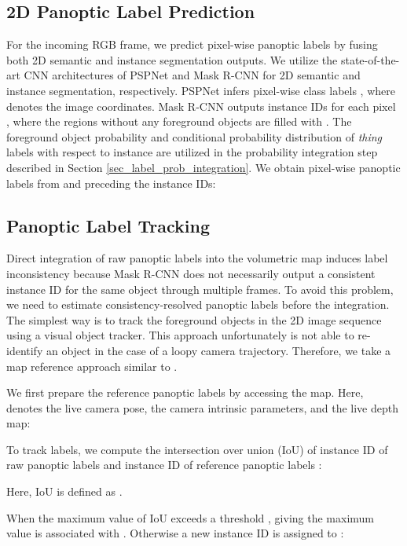 \documentclass[letterpaper, 10pt, conference]{latex_template/ieeeconf}
\begin{document}
\subsection{2D Panoptic Label Prediction\label{sec_pano_seg}}
For the incoming RGB frame, we predict pixel-wise panoptic labels by fusing both 2D semantic and instance segmentation outputs.
We utilize the state-of-the-art CNN architectures of PSPNet \cite{zhao2017pyramid} and Mask R-CNN \cite{he2017mask} for 2D semantic and instance segmentation, respectively.
PSPNet infers pixel-wise class labels , where  denotes the image coordinates.
Mask R-CNN outputs instance IDs for each pixel , where the regions without any foreground objects are filled with .
The foreground object probability  and conditional probability distribution of {\it thing} labels  with respect to instance  are utilized in the probability integration step described in Section \ref{sec_label_prob_integration}.
We obtain pixel-wise panoptic labels  from  and  preceding the instance IDs:



\subsection{Panoptic Label Tracking\label{sec_label_tracking}}
Direct integration of raw panoptic labels  into the volumetric map induces label inconsistency because Mask R-CNN does not necessarily output a consistent instance ID for the same object through multiple frames.
To avoid this problem, we need to estimate consistency-resolved panoptic labels  before the integration.
The simplest way is to track the foreground objects in the 2D image sequence using a visual object tracker.
This approach unfortunately is not able to re-identify an object in the case of a loopy camera trajectory.
Therefore, we take a map reference approach similar to \cite{runz2018maskfusion,mccormac2018fusion++}.

We first prepare the reference panoptic labels  by accessing the  map. 
Here,  denotes the live camera pose,  the camera intrinsic parameters, and  the live depth map:

To track labels, we compute the intersection over union (IoU)  of instance ID  of raw panoptic labels  and instance ID  of reference panoptic labels :

Here, IoU is defined as .

When the maximum value of IoU exceeds a threshold ,  giving the maximum value is associated with . Otherwise a new instance ID is assigned to :
\end{document}
